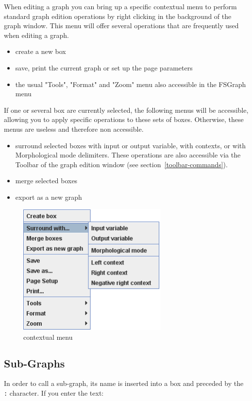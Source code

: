 \bigskip
\noindent When editing a graph you can bring up a specific contextual menu to 
perform standard graph edition operations by right clicking in the background of the graph window.
This menu will offer several operations that are frequently used when editing a graph.
\begin{itemize}
\item create a new box
\item save, print the current graph or set up the page parameters
\item the usual "Tools", "Format" and "Zoom" menu also accessible in the FSGraph menu 
\end{itemize}
If one or several box are currently selected, the following menus will be accessible, allowing you to apply specific operations to these sets of boxes. Otherwise, these menus are useless and therefore non accessible. 
\begin{itemize}
\item surround selected boxes with input or output variable, with contexts, or with Morphological mode delimiters. These operations are also accessible via the Toolbar of the graph edition window (see section~\ref{toolbar-commands}). 
\item merge selected boxes
\item export as a new graph
\end{itemize}
\bigskip
\begin{figure}[!h]
\begin{center}
\includegraphics[width=7.5cm]{resources/img/fig5-6b.png}
\caption{contextual menu\label{contextual-menu}}
\end{center}
\end{figure}

\subsection{Sub-Graphs}
\label{section-subgraphs}
\index{\verb+:+}
In order to call a sub-graph, its name is inserted into a box and preceded by the
\verb+:+ character. If you enter the text:

